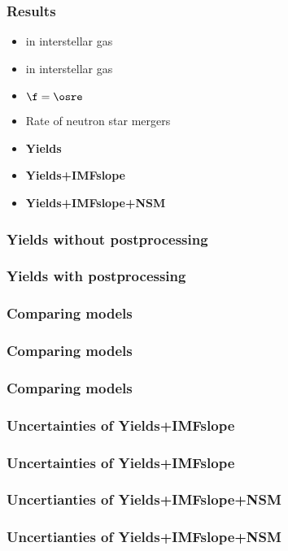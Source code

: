 
\begin{frame}
\frametitle{Results}
\begin{itemize}
\item {} in interstellar gas
\item {} in interstellar gas
\item $\f = \osre$
\item Rate of neutron star mergers
\end{itemize}
\begin{itemize}
\item \textbf{Yields}
\item \textbf{Yields+IMFslope}
\item \textbf{Yields+IMFslope+NSM}
\end{itemize}
\end{frame}

\begin{frame}
\frametitle{\textbf{Yields} without postprocessing}
\end{frame}

\begin{frame}
\frametitle{\textbf{Yields} with postprocessing}
\end{frame}

\begin{frame}
\frametitle{Comparing models}
\end{frame}

\begin{frame}
\frametitle{Comparing models}
\end{frame}

\begin{frame}
\frametitle{Comparing models}
\end{frame}

\begin{frame}
\frametitle{Uncertainties of \textbf{Yields+IMFslope}}
\end{frame}

\begin{frame}
\frametitle{Uncertainties of \textbf{Yields+IMFslope}}
\end{frame}

\begin{frame}
\frametitle{Uncertianties of \textbf{Yields+IMFslope+NSM}}
\end{frame}

\begin{frame}
\frametitle{Uncertianties of \textbf{Yields+IMFslope+NSM}}
\end{frame}
